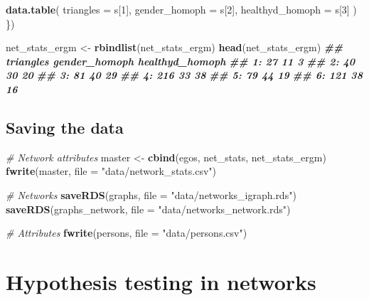 \documentclass[
]{book}
\newenvironment{Shaded}{\begin{snugshade}}{\end{snugshade}}
\newcommand{\AttributeTok}[1]{\textcolor[rgb]{0.13,0.29,0.53}{#1}}
\newcommand{\CommentTok}[1]{\textcolor[rgb]{0.56,0.35,0.01}{\textit{#1}}}
\newcommand{\DecValTok}[1]{\textcolor[rgb]{0.00,0.00,0.81}{#1}}
\newcommand{\DocumentationTok}[1]{\textcolor[rgb]{0.56,0.35,0.01}{\textbf{\textit{#1}}}}
\newcommand{\FunctionTok}[1]{\textcolor[rgb]{0.13,0.29,0.53}{\textbf{#1}}}
\newcommand{\NormalTok}[1]{#1}
\newcommand{\OtherTok}[1]{\textcolor[rgb]{0.56,0.35,0.01}{#1}}
\newcommand{\StringTok}[1]{\textcolor[rgb]{0.31,0.60,0.02}{#1}}
\begin{document}
\begin{Shaded}
\begin{Highlighting}[]
  \FunctionTok{data.table}\NormalTok{(}
    \AttributeTok{triangles       =}\NormalTok{ s[}\DecValTok{1}\NormalTok{],}
    \AttributeTok{gender\_homoph   =}\NormalTok{ s[}\DecValTok{2}\NormalTok{],}
    \AttributeTok{healthyd\_homoph =}\NormalTok{ s[}\DecValTok{3}\NormalTok{]}
\NormalTok{  )}
\NormalTok{\})}

\NormalTok{net\_stats\_ergm }\OtherTok{\textless{}{-}} \FunctionTok{rbindlist}\NormalTok{(net\_stats\_ergm)}
\FunctionTok{head}\NormalTok{(net\_stats\_ergm)}
\DocumentationTok{\#\#    triangles gender\_homoph healthyd\_homoph}
\DocumentationTok{\#\# 1:        27            11               3}
\DocumentationTok{\#\# 2:        40            30              20}
\DocumentationTok{\#\# 3:        81            40              29}
\DocumentationTok{\#\# 4:       216            33              38}
\DocumentationTok{\#\# 5:        79            44              19}
\DocumentationTok{\#\# 6:       121            38              16}
\end{Highlighting}
\end{Shaded}

\hypertarget{saving-the-data}{%
\section{Saving the data}\label{saving-the-data}}

\begin{Shaded}
\begin{Highlighting}[]
\CommentTok{\# Network attributes}
\NormalTok{master }\OtherTok{\textless{}{-}} \FunctionTok{cbind}\NormalTok{(egos, net\_stats, net\_stats\_ergm)}
\FunctionTok{fwrite}\NormalTok{(master, }\AttributeTok{file =} \StringTok{"data/network\_stats.csv"}\NormalTok{)}

\CommentTok{\# Networks}
\FunctionTok{saveRDS}\NormalTok{(graphs, }\AttributeTok{file =} \StringTok{"data/networks\_igraph.rds"}\NormalTok{)}
\FunctionTok{saveRDS}\NormalTok{(graphs\_network, }\AttributeTok{file =} \StringTok{"data/networks\_network.rds"}\NormalTok{)}

\CommentTok{\# Attributes}
\FunctionTok{fwrite}\NormalTok{(persons, }\AttributeTok{file =} \StringTok{"data/persons.csv"}\NormalTok{)}
\end{Highlighting}
\end{Shaded}

\hypertarget{hypothesis-testing-in-networks}{%
\chapter{Hypothesis testing in networks}\label{hypothesis-testing-in-networks}}
\end{document}
